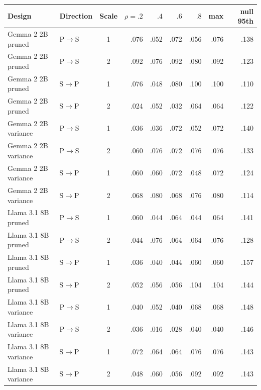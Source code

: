 \begin{tabular}{llcrrrrrr}
\toprule
Design & Direction & Scale & $\rho=.2$ & $.4$ & $.6$ & $.8$ & max & null 95th \\
\midrule
Gemma 2 2B pruned & P$\rightarrow$S & 1 & .076 & .052 & .072 & .056 & .076 & .138 \\
Gemma 2 2B pruned & P$\rightarrow$S & 2 & .092 & .076 & .092 & .080 & .092 & .123 \\
Gemma 2 2B pruned & S$\rightarrow$P & 1 & .076 & .048 & .080 & .100 & .100 & .110 \\
Gemma 2 2B pruned & S$\rightarrow$P & 2 & .024 & .052 & .032 & .064 & .064 & .122 \\
Gemma 2 2B variance & P$\rightarrow$S & 1 & .036 & .036 & .072 & .052 & .072 & .140 \\
Gemma 2 2B variance & P$\rightarrow$S & 2 & .060 & .076 & .072 & .076 & .076 & .133 \\
Gemma 2 2B variance & S$\rightarrow$P & 1 & .060 & .060 & .072 & .048 & .072 & .124 \\
Gemma 2 2B variance & S$\rightarrow$P & 2 & .068 & .080 & .068 & .076 & .080 & .114 \\
Llama 3.1 8B pruned & P$\rightarrow$S & 1 & .060 & .044 & .064 & .044 & .064 & .141 \\
Llama 3.1 8B pruned & P$\rightarrow$S & 2 & .044 & .076 & .064 & .064 & .076 & .128 \\
Llama 3.1 8B pruned & S$\rightarrow$P & 1 & .036 & .040 & .044 & .060 & .060 & .157 \\
Llama 3.1 8B pruned & S$\rightarrow$P & 2 & .052 & .056 & .056 & .104 & .104 & .144 \\
Llama 3.1 8B variance & P$\rightarrow$S & 1 & .040 & .052 & .040 & .068 & .068 & .148 \\
Llama 3.1 8B variance & P$\rightarrow$S & 2 & .036 & .016 & .028 & .040 & .040 & .146 \\
Llama 3.1 8B variance & S$\rightarrow$P & 1 & .072 & .064 & .064 & .076 & .076 & .143 \\
Llama 3.1 8B variance & S$\rightarrow$P & 2 & .048 & .060 & .056 & .092 & .092 & .143 \\
\bottomrule
\end{tabular}
